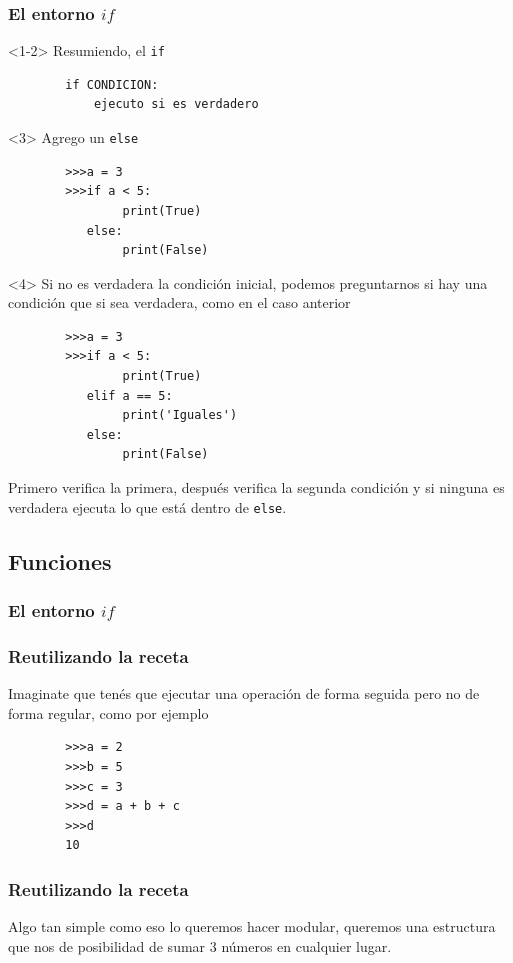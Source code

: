 \documentclass{beamer}
\begin{document}
\begin{frame}[fragile]
    \frametitle{El entorno $if$}
    \begin{onlyenv}<1-2>
    Resumiendo, el \texttt{if}
    \begin{verbatim}
        if CONDICION:
            ejecuto si es verdadero
    \end{verbatim}
    \end{onlyenv}
    \begin{onlyenv}<3>
        Agrego un \texttt{else}
        \begin{verbatim}
        >>>a = 3
        >>>if a < 5:
                print(True)
           else:
                print(False)
    \end{verbatim}
    \end{onlyenv}
    \begin{onlyenv}<4>
        Si no es verdadera la condición inicial, podemos preguntarnos si hay una condición que si sea verdadera, como en el caso anterior
        \begin{verbatim}
        >>>a = 3
        >>>if a < 5:
                print(True)
           elif a == 5:
                print('Iguales')
           else:
                print(False)
    \end{verbatim}
    Primero verifica la primera, después verifica la segunda condición y si ninguna es verdadera ejecuta lo que está dentro de \texttt{else}.
    \end{onlyenv}
\end{frame}

\subsection{Funciones}

\begin{frame}[fragile]
    \frametitle{El entorno $if$}
    \frametitle{Reutilizando la receta}
    Imaginate que tenés que ejecutar una operación de forma seguida pero no de forma regular, como por ejemplo
    \begin{verbatim}
        >>>a = 2
        >>>b = 5
        >>>c = 3
        >>>d = a + b + c
        >>>d
        10
    \end{verbatim}
    
    
\end{frame}

\begin{frame}
\frametitle{Reutilizando la receta}
    Algo tan simple como eso lo queremos hacer modular, queremos una estructura que nos de posibilidad de sumar 3 números en cualquier lugar.\\

\end{frame}
\end{document}
